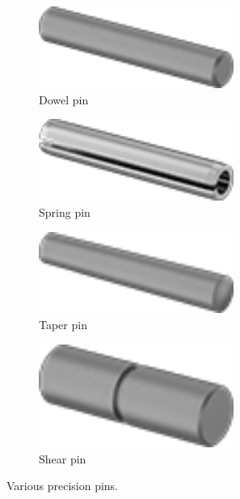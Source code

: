 \documentclass[10pt,letterpaper]{book}
\begin{document}
	\begin{figure}[H]
		\centering
		\begin{subfigure}[b]{.24\linewidth}
			\includegraphics[width=0.7\textwidth]{imgs/dpin.png}
			\caption{Dowel pin}
		\end{subfigure}\begin{subfigure}[b]{.24\linewidth}
			\includegraphics[width=0.7\textwidth]{imgs/spin.png}
			\caption{Spring pin}
		\end{subfigure}\begin{subfigure}[b]{.24\linewidth}
			\includegraphics[width=0.7\textwidth]{imgs/tpin.png}
			\caption{Taper pin}
		\end{subfigure}\begin{subfigure}[b]{.24\linewidth}
			\includegraphics[width=0.7\textwidth]{imgs/shpin.png}
			\caption{Shear pin}
		\end{subfigure}
		\caption{Various precision pins.}
	\end{figure}
	
\end{document}
